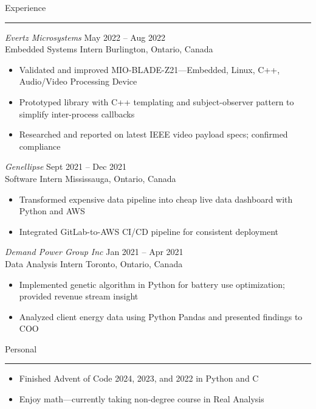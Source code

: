 \documentclass{article}
\newenvironment{mysection}[1]
{ {\large #1}

	\vspace{-1em}
	\rule{\linewidth}{0.4pt} 
} { \vspace{1em} }
\begin{document}
\begin{mysection}{Experience}
\textit{Evertz Microsystems} \hfill May 2022 – Aug 2022 \\
Embedded Systems Intern \hfill Burlington, Ontario, Canada
\begin{itemize}[noitemsep,left=0pt,label={-}]
	\item Validated and improved MIO-BLADE-Z21—Embedded, Linux, C++, Audio/Video Processing Device
	\item Prototyped library with C++ templating and subject-observer pattern to simplify inter-process callbacks
	\item Researched and reported on latest IEEE video payload specs; confirmed compliance
\end{itemize}
\vspace{1em}

\textit{Genellipse} \hfill Sept 2021 – Dec 2021 \\
Software Intern \hfill Mississauga, Ontario, Canada
\begin{itemize}[noitemsep,left=0pt,label={-}]
	\item Transformed expensive data pipeline into cheap live data dashboard with Python and AWS 
	\item Integrated GitLab-to-AWS CI/CD pipeline for consistent deployment
\end{itemize}
\vspace{1em}

\textit{Demand Power Group Inc} \hfill Jan 2021 – Apr 2021 \\
Data Analysis Intern \hfill Toronto, Ontario, Canada
\begin{itemize}[noitemsep,left=0pt,label={-}]
	\item Implemented genetic algorithm in Python for battery use optimization; provided revenue stream insight
	\item Analyzed client energy data using Python Pandas and presented findings to COO
\end{itemize}
\end{mysection}

\begin{mysection}{Personal}
\begin{itemize}[noitemsep,left=0pt,label={-}]
	\item Finished Advent of Code 2024, 2023, and 2022 in Python and C
	\item Enjoy math---currently taking non-degree course in Real Analysis
\end{itemize}
\end{mysection}
\end{document}
